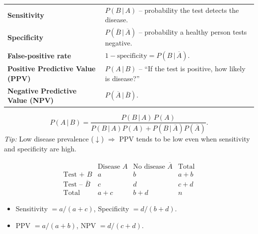 \documentclass[12pt]{book}
\begin{document}
\begin{itemize}
\begin{tabular}{@{}ll@{}}
\textbf{Sensitivity} & $P(B\,|\,A)$          – probability the test detects the disease.\\
\textbf{Specificity} & $P(\overline{B}\,|\,\overline{A})$ – probability a healthy person tests negative.\\
\textbf{False-positive rate} & $1-\text{specificity}=P(B\,|\,\overline{A})$.\\
\textbf{Positive Predictive Value (PPV)} & $P(A\,|\,B)$ – “If the test is positive, how likely is disease?”\\
\textbf{Negative Predictive Value (NPV)} & $P(\overline{A}\,|\,\overline{B})$.\\
\end{tabular}

\[
  P(A\,|\,B)=\frac{P(B\,|\,A)\,P(A)}{P(B\,|\,A)P(A)+P(B\,|\,\overline{A})P(\overline{A})}.
\]
\emph{Tip:} Low disease prevalence ($\downarrow$) $\Rightarrow$ PPV tends to be low even when sensitivity and specificity are high.

\[
\begin{array}{c|cc|c}
           & \text{Disease }A & \text{No disease }\overline{A} & \text{Total} \\ \hline
\text{Test + }B     & a & b & a+b \\
\text{Test – }\overline{B} & c & d & c+d \\ \hline
\text{Total} & a+c & b+d & n
\end{array}
\]
\begin{itemize}
  \item Sensitivity $=a/(a+c)$,\; Specificity $=d/(b+d)$.
  \item PPV $=a/(a+b)$,\; NPV $=d/(c+d)$.
\end{itemize}

\end{itemize}


\end{document}
